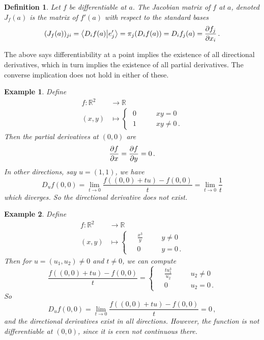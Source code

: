 \documentclass{article}
\theoremstyle{plain}\theoremheaderfont{\normalfont\itshape}\theorembodyfont{\rmfamily}\theoremseparator{.}\newtheorem*{rem}{Remark}\newtheorem*{ex}{Example}\newtheorem*{proof}{Proof}\newtheorem*{altp}{Alternative proof}
\theoremstyle{plain}\theoremheaderfont{\normalfont\bfseries}\theorembodyfont{\rmfamily}\theoremseparator{.}\newtheorem{thm}{Theorem}[section]\newtheorem{lem}[thm]{Lemma}\newtheorem{prop}[thm]{Proposition}\newtheorem*{cor}{Corollary}\newtheorem{defn}[thm]{Definition}\newtheorem{clm}[thm]{Claim}\newtheorem{clminproof}{Claim}
\theoremstyle{break}\theoremheaderfont{\normalfont\itshape}\theorembodyfont{\rmfamily}\theoremseparator{.\medskip}\newtheorem*{proofskip}{Proof}\newtheorem*{exs}{Examples}\newtheorem*{rems}{Remarks}
\theoremstyle{break}\theoremheaderfont{\normalfont\bfseries}\theorembodyfont{\rmfamily}\theoremseparator{.\medskip}\newtheorem{lemskip}[thm]{Lemma}\newtheorem{defnskip}[thm]{Definition}\newtheorem{propskip}[thm]{Proposition}\newtheorem{thmskip}[thm]{Theorem}
\begin{document}
    \begin{defn}
        Let \(f\) be differentiable at \(a\). The \textit{Jacobian matrix} of \(f\) at \(a\), denoted \(J_f(a)\) is the matrix of \(f'(a)\) with respect to the standard bases
        \[(J_f(a))_{ji}=\braket{D_if(a)}{e'_j}=\pi_j(D_if(a))=D_if_j(a)=\pdv{f_j}{x_i}\,.\]
    \end{defn}
    The above says differentiability at a point implies the existence of all directional derivatives, which in turn implies the existence of all partial derivatives. The converse implication does not hold in either of these.
    \begin{ex}
        Define
        \begin{align*}
            f:\mathbb{R}^2&\to\mathbb{R}\\
            (x,y)&\mapsto\left\{\begin{aligned}
                \;0 & \qquad xy=0\\
                \;1 & \qquad xy\ne 0\,.
            \end{aligned}\right.
        \end{align*}
        Then the partial derivatives at \((0,0)\) are
        \[\pdv{f}{x}(0,0)=\pdv{f}{y}(0,0)=0\,.\]
        In other directions, say \(u=(1,1)\), we have
        \[D_{u}f(0,0)=\lim_{t\to 0}\frac{f((0,0)+tu)-f(0,0)}{t}=\lim_{t\to 0}\frac{1}{t}\]
        which diverges. So the directional derivative does not exist.
    \end{ex}
    \begin{ex}
        Define
        \begin{align*}
            f:\mathbb{R}^2&\to\mathbb{R}\\
            (x,y)&\mapsto\left\{\begin{aligned}
                &\;\frac{x^3}{y} && \quad y\ne0\\
                &\;0 && \quad y=0\,.
            \end{aligned}\right.
        \end{align*}
        Then for \(u=(u_1,u_2)\ne 0\) and \(t\ne 0\), we can compute
        \[\frac{f((0,0)+tu)-f(0,0)}{t}=\left\{\begin{aligned}
            &\;\frac{tu_1^3}{u_2} &&\quad u_2\ne 0\\
            &\;0 &&\quad u_2=0\,.
        \end{aligned}\right.\]
        So
        \[D_uf(0,0)=\lim_{t\to 0}\frac{f((0,0)+tu)-f(0,0)}{t}=0\,,\]
        and the directional derivatives exist in all directions. However, the function is not differentiable at \((0,0)\), since it is even not continuous there. 
    \end{ex}
\end{document}
